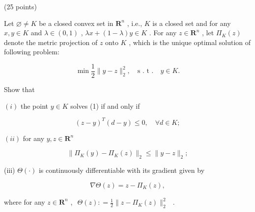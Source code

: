 \begin{exercise}
\label{applied:2019:3}
(25 points)

Let $\varnothing \neq K$ be a closed convex set in $\mathbf { R } ^ { n }$ , i.e., $K$ is a closed set and for any $x , y \in K$ and $\lambda \in ( 0 , 1 )$ , $\lambda x + ( 1 - \lambda ) y \in K$ . For any $z \in \mathbf { R } ^ { n }$ , let $\Pi _ { K } ( z )$ denote the metric projection of $z$ onto $K$ , which is the unique optimal solution of following problem:

\[
\min  \frac {1}{2} \| y - z \| _ {2} ^ {2}, \quad \text {s . t .} \quad y \in K. \tag {1}
\]

Show that

$( i )$ the point $y \in K$ solves (1) if and only if

\[
\left(z - y\right) ^ {T} (d - y) \leqslant 0, \quad \forall d \in K;
\]

$( i i )$ for any $y , z \in \mathbf { R } ^ { n }$

\[
\| \Pi_ {K} (y) - \Pi_ {K} (z) \| _ {2} \leq \| y - z \| _ {2};
\]

(iii) $\Theta ( \cdot )$ is continuously differentiable with its gradient given by

\[
\nabla \Theta (z) = z - \Pi_ {K} (z),
\]

where for any $z \in \mathbf { R } ^ { n }$ , $\begin{array} { r } { \Theta ( z ) : = \frac { 1 } { 2 } \| z - \Pi _ { K } ( z ) \| _ { 2 } ^ { 2 } } \end{array}$ .
\end{exercise}

